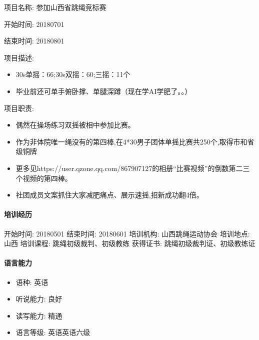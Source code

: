 \documentclass[letterpaper,11pt,english]{sphinxmanual}
\begin{document}
项目名称: 参加山西省跳绳竞标赛

开始时间: 2018\sphinxhyphen{}07\sphinxhyphen{}01

结束时间: 2018\sphinxhyphen{}08\sphinxhyphen{}01

项目描述:
\begin{itemize}
\item {} 
30s单摇：66;30s双摇：60;三摇：11个

\item {} 
毕业前还可单手俯卧撑、单腿深蹲（现在学AI学肥了。。）

\end{itemize}

项目职责:
\begin{itemize}
\item {} 
偶然在操场练习双摇被相中参加比赛。

\item {} 
作为非体院唯一绳没有的第四棒,在4*30男子团体单摇比赛共250个,取得市和省级铜牌

\item {} 
更多见https://user.qzone.qq.com/867907127的相册“比赛视频”的倒数第二三个视频的第四棒。

\item {} 
社团成员文案抓住大家减肥痛点、展示速摇,招新成功翻4倍。

\end{itemize}


\paragraph{培训经历}
\label{\detokenize{get_started:id6}}
开始时间: 2018\sphinxhyphen{}05\sphinxhyphen{}01 结束时间: 2018\sphinxhyphen{}06\sphinxhyphen{}01 培训机构: 山西跳绳运动协会
培训地点: 山西 培训课程: 跳绳初级裁判、初级教练 获得证书:
跳绳初级裁判证、初级教练证


\paragraph{语言能力}
\label{\detokenize{get_started:id7}}\begin{itemize}
\item {} 
语种: 英语

\item {} 
听说能力: 良好

\item {} 
读写能力: 精通

\item {} 
语言等级: 英语\sphinxhyphen{}英语六级

\end{itemize}
\end{document}
